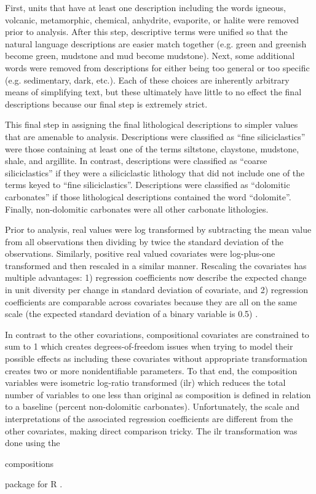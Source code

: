 \documentclass[12pt,letterpaper]{article}
\begin{document}
First, units that have at least one description including the words igneous, volcanic, metamorphic, chemical, anhydrite, evaporite, or halite were removed prior to analysis. After this step, descriptive terms were unified so that the natural language descriptions are easier match together (e.g. green and greenish become green, mudstone and mud become mudstone). Next, some additional words were removed from descriptions for either being too general or too specific (e.g. sedimentary, dark, etc.). Each of these choices are inherently arbitrary means of simplifying text, but these ultimately have little to no effect the final descriptions because our final step is extremely strict.

This final step in assigning the final lithological descriptions to simpler values that are amenable to analysis. Descriptions were classified as ``fine siliciclastics'' were those containing at least one of the terms siltstone, claystone, mudstone, shale, and argillite. In contrast, descriptions were classified as ``coarse siliciclastics'' if they were a siliciclastic lithology that did not include one of the terms keyed to ``fine siliciclastics''. Descriptions were classified as ``dolomitic carbonates'' if those lithological descriptions contained the word ``dolomite''. Finally, non-dolomitic carbonates were all other carbonate lithologies.

Prior to analysis, real values were log transformed by subtracting the mean value from all observations then dividing by twice the standard deviation of the observations. Similarly, positive real valued covariates were log-plus-one transformed and then rescaled in a similar manner. Rescaling the covariates has multiple advantages: 1) regression coefficients now describe the expected change in unit diversity per change in standard deviation of covariate, and 2) regression coefficients are comparable across covariates because they are all on the same scale (the expected standard deviation of a binary variable is 0.5) \citep{ARM}. 

In contrast to the other covariations, compositional covariates are constrained to sum to 1 which creates degrees-of-freedom issues when trying to model their possible effects as including these covariates without appropriate transformation creates two or more nonidentifiable parameters. To that end, the composition variables were isometric log-ratio transformed (ilr) \citep{Egozcue2003} which reduces the total number of variables to one less than original as composition is defined in relation to a baseline (percent non-dolomitic carbonates). Unfortunately, the scale and interpretations of the associated regression coefficients are different from the other covariates, making direct comparison tricky. The ilr transformation was done using the \begin{tt} compositions \end{tt} package for R \citep{compositionsR}.
\end{document}
